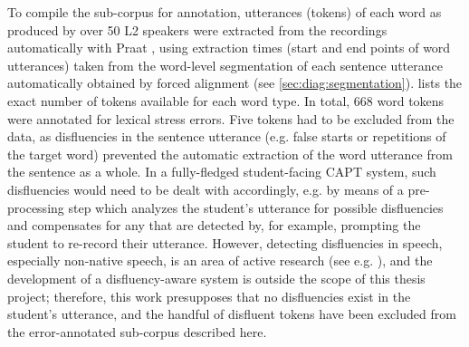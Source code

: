 	To compile the sub-corpus for annotation, utterances (tokens) of each word as produced by over 50 L2 speakers were extracted from the recordings automatically with Praat \parencite{Boersma2014}, using extraction times (start and end points of word utterances) taken from the word-level segmentation of each sentence utterance automatically obtained by forced alignment (see \cref{sec:diag:segmentation}).
	 lists the exact number of tokens available for each word type. In total, 
	668 word tokens were annotated for lexical stress errors. 
	Five tokens had to be excluded from the data, as disfluencies in the sentence utterance (e.g. false starts or repetitions of the target word) prevented the automatic extraction of the word utterance from the sentence as a whole. In a fully-fledged student-facing CAPT system, such disfluencies would need to be dealt with accordingly, e.g. by means of a pre-processing step which analyzes the student's utterance for possible disfluencies and compensates for any that are detected by, for example, prompting the student to re-record their utterance. However, detecting disfluencies in speech, especially non-native speech, is an area of active research (see e.g. ), and the development of a  disfluency-aware system is outside the scope of this thesis project; therefore, this work presupposes that no disfluencies exist in the student's utterance, and the handful of disfluent tokens have been excluded from the error-annotated sub-corpus described here.
	
